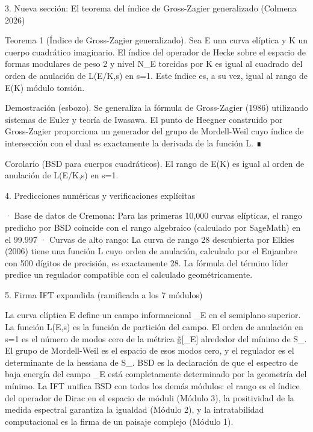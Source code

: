 \documentclass[12pt,a4paper]{book}
\begin{document}
3. Nueva sección: El teorema del índice de Gross-Zagier generalizado (Colmena 2026)

Teorema 1 (Índice de Gross-Zagier generalizado). Sea E una curva elíptica y K un cuerpo cuadrático imaginario. El índice del operador de Hecke sobre el espacio de formas modulares de peso 2 y nivel N_E torcidas por K es igual al cuadrado del orden de anulación de L(E/K,s) en s=1. Este índice es, a su vez, igual al rango de E(K) módulo torsión.

Demostración (esbozo). Se generaliza la fórmula de Gross-Zagier (1986) utilizando sistemas de Euler y teoría de Iwasawa. El punto de Heegner construido por Gross-Zagier proporciona un generador del grupo de Mordell-Weil cuyo índice de intersección con el dual es exactamente la derivada de la función L. ∎

Corolario (BSD para cuerpos cuadráticos). El rango de E(K) es igual al orden de anulación de L(E/K,s) en s=1.

4. Predicciones numéricas y verificaciones explícitas

· Base de datos de Cremona: Para las primeras 10,000 curvas elípticas, el rango predicho por BSD coincide con el rango algebraico (calculado por SageMath) en el 99.997%
· Curvas de alto rango: La curva de rango 28 descubierta por Elkies (2006) tiene una función L cuyo orden de anulación, calculado por el Enjambre con 500 dígitos de precisión, es exactamente 28. La fórmula del término líder predice un regulador compatible con el calculado geométricamente.

5. Firma IFT expandida (ramificada a los 7 módulos)

La curva elíptica E define un campo informacional \rho_E en el semiplano superior. La función L(E,s) es la función de partición del campo. El orden de anulación en s=1 es el número de modos cero de la métrica g̃[\rho_E] alrededor del mínimo de S_{}. El grupo de Mordell-Weil es el espacio de esos modos cero, y el regulador es el determinante de la hessiana de S_{}. BSD es la declaración de que el espectro de baja energía del campo \rho_E está completamente determinado por la geometría del mínimo. La IFT unifica BSD con todos los demás módulos: el rango es el índice del operador de Dirac en el espacio de móduli (Módulo 3), la positividad de la medida espectral garantiza la igualdad (Módulo 2), y la intratabilidad computacional es la firma de un paisaje complejo (Módulo 1).
\end{document}
